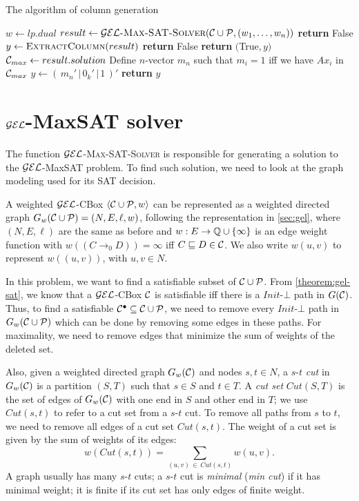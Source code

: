 \begin{algorithm}
	\caption{The algorithm of column generation}
	\label{alg:gen-col}
	\begin{algorithmic}[1]
		\State $w \gets lp.dual$
		\State $result \gets \Call{$\gel$-Max-SAT-Solver}{\CC \cup \PP, (w_1, \dots, w_n)}$
		\State \textbf{return} False
		\EndIf
		\Statex
		\State $y \gets \Call{ExtractColumn}{result}$
		\State \textbf{return} False
		\EndIf
		\Statex
		\State \textbf{return} $($True$, y)$
		\EndFunction
		\Statex
		\State $\mathcal{C}_{max} \gets result.solution$
		\State Define $n$-vector $m_n$ such that $m_i = 1$ iff we have $Ax_i$ in $\mathcal{C}_{max}$
		\State $y \gets (\, m_n' \, | \, 0_k' \, |\, 1 \,)'$
		\State \textbf{return} $y$
		\EndFunction
	\end{algorithmic}
\end{algorithm}


\section{\texorpdfstring{$\mathcal{GEL}$}{GEL}-MaxSAT solver}

The function $\mathcal{GEL}$\textsc{-Max-SAT-Solver} is responsible for generating a solution to the $\mathcal{GEL}$-MaxSAT problem. To find such solution, we need to look at the graph modeling used for its SAT decision.

A weighted $\mathcal{GEL}$-CBox $\langle\mathcal{C}\cup\mathcal{P}, w\rangle$ can be represented as a weighted directed graph $G_w(\mathcal{C}\cup\mathcal{P}) = (N, E, \ell, w)$, following the representation in \cref{sec:gel}, where $(N, E, \ell)$ are the same as before and $w: E \to \mathbb{Q} \cup \{\infty\}$ is an edge weight function with $w\left(\left(C \to_0 D\right)\right) = \infty$ iff $C \sqsubseteq D \in \mathcal{C}$. We also write $w(u, v)$ to represent $w((u, v))$, with $u, v \in N$.

In this problem, we want to find a satisfiable subset of $\mathcal{C} \cup \mathcal{P}$. From \cref{theorem:gel-sat}, we know that a $\mathcal{GEL}$-CBox $\mathcal{C}$ is satisfiable iff there is a $Init$-$\bot$ path in $G(\mathcal{C})$. Thus, to find a satisfiable $\mathcal{C}^\bullet \subseteq \mathcal{C} \cup \mathcal{P}$, we need to remove every $Init$-$\bot$ path in $G_w(\mathcal{C} \cup \mathcal{P})$ which can be done by removing some edges in these paths. For maximality, we need to remove edges that minimize the sum of weights of the deleted set.

Also, given a weighted directed graph $G_w(\mathcal{C})$ and nodes $s, t \in N$, a $s$-$t$ \emph{cut} in $G_w(\mathcal{C})$ is a partition $(S, T)$ such that $s \in S$ and $t \in T$. A \emph{cut set} $Cut(S, T)$ is the set of edges of $G_w(\mathcal{C})$ with one end in $S$ and other end in $T$; we use $Cut(s, t)$ to refer to a cut set from a $s$-$t$ cut.  To remove all paths from $s$ to $t$, we need to remove all edges of a cut set $Cut(s, t)$. The weight of a cut set is given by the sum of weights of its edges:
\[
	w(Cut(s, t)) = \sum_{(u, v) \, \in \, Cut(s, t)} w(u, v).
\]
A graph usually has many $s$-$t$ cuts; a $s$-$t$ cut is \emph{minimal} (\emph{min cut}) if it has minimal weight; it is finite if its cut set has only edges of finite weight.

